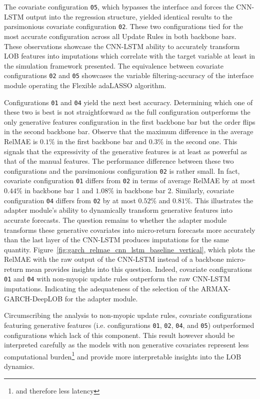 \documentclass{rQUF2e}
\theoremstyle{plain}
\theoremstyle{definition}
\theoremstyle{remark}
\begin{document}
The covariate configuration \verb|05|, which bypasses the interface and forces the CNN-LSTM output into the regression structure, yielded identical results to the parsimonious covariate configuration \verb|02|. These two configurations tied for the most accurate configuration across all Update Rules in both backbone bars. These observations showcase the CNN-LSTM ability to accurately transform LOB features into imputations which correlate with the target variable at least in the simulation framework presented. The equivalence between covariate configurations \verb|02| and \verb|05| showcases the variable filtering-accuracy of the interface module operating the Flexible adaLASSO algorithm.

Configurations \verb|01| and \verb|04| yield the next best accuracy. Determining which one of these two is best is not straightforward as the full configuration outperforms the only generative features configuration in the first backbone bar but the order flips in the second backbone bar. Observe that the maximum difference in the average RelMAE is $0.1\%$ in the first backbone bar and $0.3\%$ in the second one. This signals that the expressivity of the generative features is at least as powerful as that of the manual features. The performance difference between these two configurations and the parsimonious configuration \verb|02| is rather small. In fact, covariate configuration \verb|01| differs from \verb|02| in terms of average RelMAE by at most $0.44\%$ in backbone bar 1 and $1.08\%$ in backbone bar 2. Similarly, covariate configuration \verb|04| differs from \verb|02| by at most $0.52\%$ and $0.81\%$. This illustrates the adapter module's ability to dynamically transform generative features into accurate forecasts. The question remains to whether the adapter module transforms these generative covariates into micro-return forecasts more accurately than the last layer of the CNN-LSTM produces imputations for the same quantity. Figure~\ref{fig:garch_relmae_cnn_lstm_baseline_vertical}, which plots the RelMAE with the raw output of the CNN-LSTM instead of a backbone micro-return mean provides insights into this question. Indeed, covariate configurations \verb|01| and \verb|04| with non-myopic update rules outperform the raw CNN-LSTM imputations. Indicating the adequateness of the selection of the ARMAX-GARCH-DeepLOB for the adapter module.

Circumscribing the analysis to non-myopic update rules, covariate configurations featuring generative features (i.e. configurations \verb|01|, \verb|02|, \verb|04|, and \verb|05|) outperformed configurations which lack of this component. This result however should be interpreted carefully as the models with non generative covariates represent less computational burden\footnote{and therefore less latency} and provide more interpretable insights into the LOB dynamics.
\end{document}
